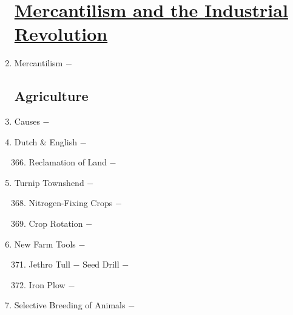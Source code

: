 \documentclass[12pt]{article}
\begin{document}
\begin{enumerate}
\section[\underline{Mercantilism, Agricultural Revolution, \& Industrial Revolution}]{\underline{Mercantilism and the Industrial Revolution}}

\item Mercantilism $-$ 

\subsection{Agriculture}

\item Causes $-$ 

\item Dutch \& English $-$ 
 
\begin{enumerate}[label=\arabic{*}.]
\setcounter{enumii}{365}

\item Reclamation of Land $-$

\end{enumerate}
\setcounter{enumi}{366}

\item Turnip Townshend $-$ 

\begin{enumerate}[label=\arabic{*}.]
\setcounter{enumii}{367}

\item Nitrogen-Fixing Crops $-$

\item Crop Rotation $-$

\end{enumerate}
\setcounter{enumi}{369}

\item New Farm Tools $-$ 

\begin{enumerate}[label=\arabic{*}.]
\setcounter{enumii}{370}

\item Jethro Tull $-$ Seed Drill $-$

\item Iron Plow $-$ 

\end{enumerate}
\setcounter{enumi}{372}

\item Selective Breeding of Animals $-$ 

\begin{enumerate}[label=\arabic{*}.]
\setcounter{enumii}{373}


\end{enumerate}
\end{enumerate}
\end{document}
